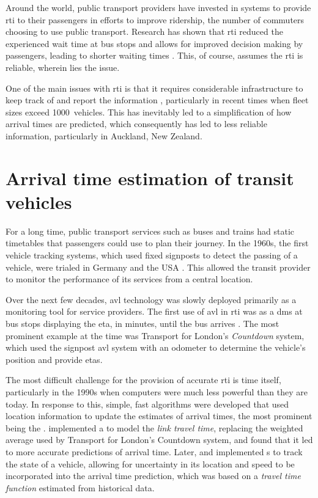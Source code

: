 Around the world, public transport providers have invested in systems to provide \gls{rti} to their passengers in efforts to improve ridership, the number of commuters choosing to use public transport. Research has shown that \gls{rti} reduced the experienced wait time at bus stops \citep{TCRP_2003} and allows for improved decision making by passengers, leading to shorter waiting times \citep{Cats_2015,Lu_2017}. This, of course, assumes the \gls{rti} is reliable, wherein lies the issue.


One of the main issues with \gls{rti} is that it requires considerable infrastructure to keep track of and report the information \citep{TCRP_2003b}, particularly in recent times when fleet sizes exceed 1000~vehicles. This has inevitably led to a simplification of how arrival times are predicted, which consequently has led to less reliable information, particularly in Auckland, New Zealand.


\section{Arrival time estimation of transit vehicles}
\label{sec:literature}

For a long time, public transport services such as buses and trains had static timetables that passengers could use to plan their journey. In the 1960s, the first vehicle tracking systems, which used fixed signposts to detect the passing of a vehicle, were trialed in Germany and the USA \citep{TCRP_1997}. This allowed the transit provider to monitor the \rt{} performance of its services from a central location.


Over the next few decades, \gls{avl} technology was slowly deployed primarily as a monitoring tool for service providers. The first use of \gls{avl} in \gls{rti} was as a \gls{dms} at bus stops displaying the \gls{eta}, in minutes, until the bus arrives \citep{TCRP_2003}. The most prominent example at the time was Transport for London's \emph{Countdown} system, which used the signpost \gls{avl} system with an odometer to determine the vehicle's position and provide \glspl{eta}.



The most difficult challenge for the provision of accurate \gls{rti} is time itself, particularly in the 1990s when computers were much less powerful than they are today. In response to this, simple, fast algorithms were developed that used \rt{} location information to update the estimates of arrival times, the most prominent being the \kf{}. \citet{Reinhoudt_1997} implemented a \kf{} to model the \emph{link travel time}, replacing the weighted average used by Transport for London's Countdown system, and found that it led to more accurate predictions of arrival time. Later, \citet{Wall_1999} and \citet{Dailey_2001} implemented \kf{}s to track the state of a vehicle, allowing for uncertainty in its location and speed to be incorporated into the arrival time prediction, which was based on a \emph{travel time function} estimated from historical data.



